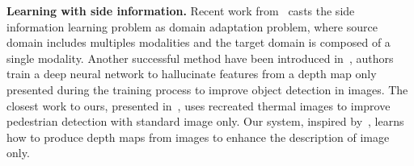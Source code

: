 \vspace{4pt}\noindent\textbf{Learning with side information.} Recent work from~\cite{Li2017b} casts the side information learning problem as domain adaptation problem, where source domain includes multiples modalities and the target domain is composed of a single modality. Another successful method have been introduced in~\cite{Hoffman2016}, authors train a deep neural network to hallucinate features from a depth map only presented during the training process to improve object detection in images. The closest work to ours, presented in~\cite{xu2017learning}, uses recreated thermal images to improve pedestrian detection with standard image only. Our system, inspired by~\cite{xu2017learning}, learns how to produce depth maps from images to enhance the description of image only.
